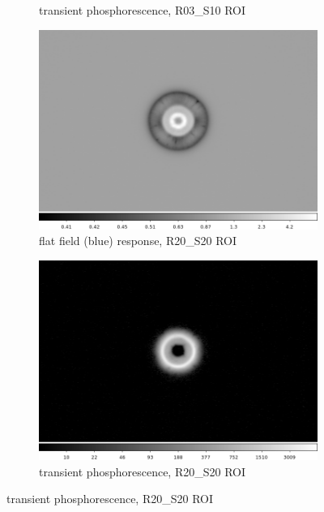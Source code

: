 \begin{figure}[!htbp]
\begin{subfigure}{0.45\textwidth}
     \caption{transient phosphorescence, R03\_S10 ROI}
     \label{subfig:phosresp_R03_S10}
\end{subfigure}
\newline
\begin{subfigure}{0.45\textwidth}
    \includegraphics[width=\textwidth]{figures/phosphorescence-survey/vamp_comp_R20_S20_flatresp.png}
     \caption{flat field (blue) response, R20\_S20 ROI}
     \label{subfig:flatresp_R20_S20}
\end{subfigure}
\begin{subfigure}{0.45\textwidth}
    \includegraphics[width=\textwidth]{figures/phosphorescence-survey/vamp_comp_R20_S20_phosresp.png}
     \caption{transient phosphorescence, R20\_S20 ROI}
     \label{subfig:phosresp_R20_S20}
\end{subfigure}

\end{figure}
